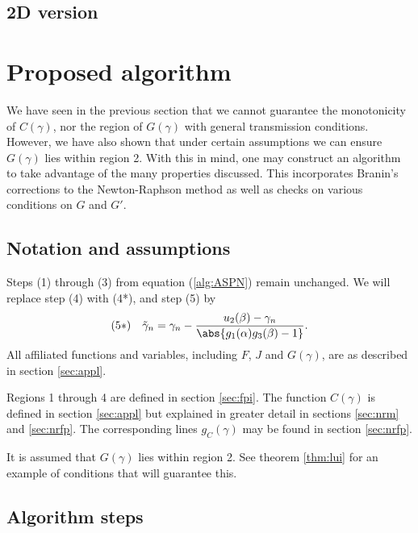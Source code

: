 \documentclass{article}
\begin{document}
\subsection{2D version}

\section{Proposed algorithm}
\label{sec:algo}

We have seen in the previous section that we cannot guarantee the monotonicity of $C(\gamma)$, nor the region of $G(\gamma)$ with general transmission conditions.
However, we have also shown that under certain assumptions we can ensure $G(\gamma)$ lies within region 2.
With this in mind, one may construct an algorithm to take advantage of the many properties discussed.
This incorporates Branin's corrections to the Newton-Raphson method as well as checks on various conditions on $G$ and $G'$.

\subsection{Notation and assumptions}

Steps (1) through (3) from equation (\ref{alg:ASPN}) remain unchanged.
We will replace step (4) with (4*), and step (5) by
\begin{equation*}
(5*) \quad \tilde{\gamma}_n = \gamma_n - \frac{u_2(\beta) - \gamma_n}{\abs{g_1(\alpha) g_3(\beta) - 1}} .
\end{equation*}
All affiliated functions and variables, including $F$, $J$ and $G(\gamma)$, are as described in section \ref{sec:appl}.

Regions 1 through 4 are defined in section \ref{sec:fpi}.
The function $C(\gamma)$ is defined in section \ref{sec:appl} but explained in greater detail in sections \ref{sec:nrm} and \ref{sec:nrfp}.
The corresponding lines $g_C(\gamma)$ may be found in section \ref{sec:nrfp}.

It is assumed that $G(\gamma)$ lies within region 2.
See theorem \ref{thm:lui} for an example of conditions that will guarantee this.

\subsection{Algorithm steps}
\end{document}
